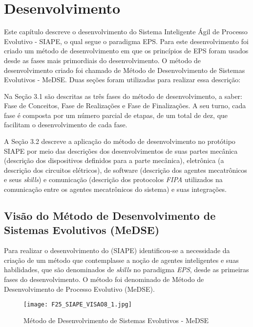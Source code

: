 \chapter{Desenvolvimento}
\label{cap:desenvolvimento}

Este capítulo descreve o desenvolvimento do  Sistema Inteligente Ágil de Processo Evolutivo - SIAPE, o qual segue o paradigma EPS. Para este desenvolvimento foi criado um método de desenvolvimento em que os princípios de EPS foram usados desde as fases mais primordiais do desenvolvimento. O método de desenvolvimento criado foi chamado de Método de Desenvolvimento de Sistemas Evolutivos - MeDSE. Duas seções foram utilizadas para realizar essa descrição: 

Na Seção 3.1 são descritas as três fases do método de desenvolvimento, a saber: Fase de Conceitos, Fase de Realizações e Fase de Finalizações. A seu turno, cada fase é composta por um número parcial de etapas, de um total de dez, que facilitam o desenvolvimento de cada fase.

A Seção 3.2 descreve a aplicação do método de desenvolvimento no protótipo SIAPE por meio das descrições dos desenvolvimentos de suas partes mecânica (descrição dos dispositivos definidos para a parte mecânica), eletrônica (a descrição dos circuitos elétricos), de software (descrição dos agentes mecatrônicos e seus \textit{skills})  e comunicação (descrição dos protocolos \textit{FIPA} utilizados na comunicação entre os agentes mecatrônicos do sistema) e suas  integrações.



\section{Visão do Método de Desenvolvimento de Sistemas Evolutivos (MeDSE)}

Para realizar o desenvolvimento do (SIAPE) identificou-se a necessidade da criação de um método que contemplasse a noção de agentes inteligentes e suas habilidades, que são denominados de \textit{skills} no paradigma \textit{EPS}, desde as primeiras fases do desenvolvimento. O método foi denominado de Método de Desenvolvimento de Processo Evolutivo (MeDSE). 

\begin{landscape}
 	\begin{figure}[h]
  		\centering
 		\texttt{[image: F25\_SIAPE\_VISAO8\_1.jpg]} 
 		\caption{Método de Desenvolvimento de Sistemas Evolutivos - MeDSE}
 		\label{F13_1}
 	\end{figure}
\end{landscape}
 
